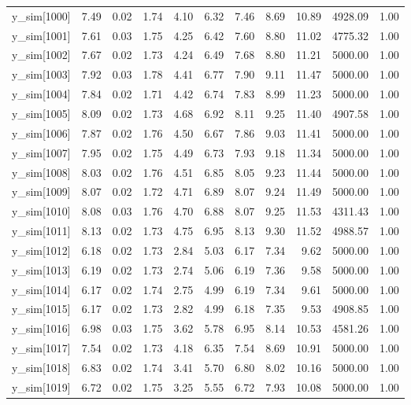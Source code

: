 \begin{table}[ht]
\begin{tabular}{rrrrrrrrrrr}
  y\_sim[1000] & 7.49 & 0.02 & 1.74 & 4.10 & 6.32 & 7.46 & 8.69 & 10.89 & 4928.09 & 1.00 \\ 
  y\_sim[1001] & 7.61 & 0.03 & 1.75 & 4.25 & 6.42 & 7.60 & 8.80 & 11.02 & 4775.32 & 1.00 \\ 
  y\_sim[1002] & 7.67 & 0.02 & 1.73 & 4.24 & 6.49 & 7.68 & 8.80 & 11.21 & 5000.00 & 1.00 \\ 
  y\_sim[1003] & 7.92 & 0.03 & 1.78 & 4.41 & 6.77 & 7.90 & 9.11 & 11.47 & 5000.00 & 1.00 \\ 
  y\_sim[1004] & 7.84 & 0.02 & 1.71 & 4.42 & 6.74 & 7.83 & 8.99 & 11.23 & 5000.00 & 1.00 \\ 
  y\_sim[1005] & 8.09 & 0.02 & 1.73 & 4.68 & 6.92 & 8.11 & 9.25 & 11.40 & 4907.58 & 1.00 \\ 
  y\_sim[1006] & 7.87 & 0.02 & 1.76 & 4.50 & 6.67 & 7.86 & 9.03 & 11.41 & 5000.00 & 1.00 \\ 
  y\_sim[1007] & 7.95 & 0.02 & 1.75 & 4.49 & 6.73 & 7.93 & 9.18 & 11.34 & 5000.00 & 1.00 \\ 
  y\_sim[1008] & 8.03 & 0.02 & 1.76 & 4.51 & 6.85 & 8.05 & 9.23 & 11.44 & 5000.00 & 1.00 \\ 
  y\_sim[1009] & 8.07 & 0.02 & 1.72 & 4.71 & 6.89 & 8.07 & 9.24 & 11.49 & 5000.00 & 1.00 \\ 
  y\_sim[1010] & 8.08 & 0.03 & 1.76 & 4.70 & 6.88 & 8.07 & 9.25 & 11.53 & 4311.43 & 1.00 \\ 
  y\_sim[1011] & 8.13 & 0.02 & 1.73 & 4.75 & 6.95 & 8.13 & 9.30 & 11.52 & 4988.57 & 1.00 \\ 
  y\_sim[1012] & 6.18 & 0.02 & 1.73 & 2.84 & 5.03 & 6.17 & 7.34 & 9.62 & 5000.00 & 1.00 \\ 
  y\_sim[1013] & 6.19 & 0.02 & 1.73 & 2.74 & 5.06 & 6.19 & 7.36 & 9.58 & 5000.00 & 1.00 \\ 
  y\_sim[1014] & 6.17 & 0.02 & 1.74 & 2.75 & 4.99 & 6.19 & 7.34 & 9.61 & 5000.00 & 1.00 \\ 
  y\_sim[1015] & 6.17 & 0.02 & 1.73 & 2.82 & 4.99 & 6.18 & 7.35 & 9.53 & 4908.85 & 1.00 \\ 
  y\_sim[1016] & 6.98 & 0.03 & 1.75 & 3.62 & 5.78 & 6.95 & 8.14 & 10.53 & 4581.26 & 1.00 \\ 
  y\_sim[1017] & 7.54 & 0.02 & 1.73 & 4.18 & 6.35 & 7.54 & 8.69 & 10.91 & 5000.00 & 1.00 \\ 
  y\_sim[1018] & 6.83 & 0.02 & 1.74 & 3.41 & 5.70 & 6.80 & 8.02 & 10.16 & 5000.00 & 1.00 \\ 
  y\_sim[1019] & 6.72 & 0.02 & 1.75 & 3.25 & 5.55 & 6.72 & 7.93 & 10.08 & 5000.00 & 1.00 \\ 

\end{tabular}
\end{table}
